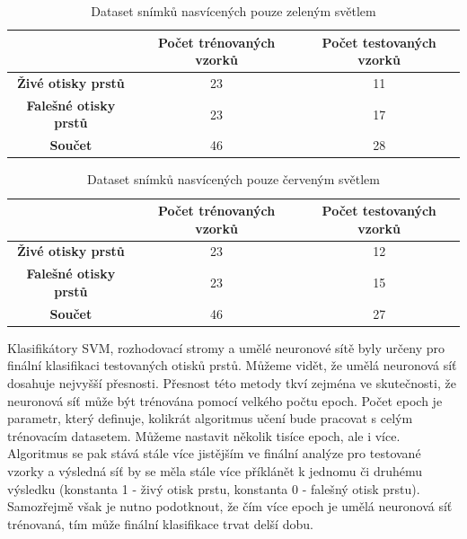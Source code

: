 \capstartfalse
\begin{table}[!htbp]
\centering
\begin{tabular}{|c|c|c|}
\hline
\textbf{}                     & \textbf{Počet trénovaných vzorků} & \textbf{Počet testovaných vzorků} \\ \hline
\textbf{Živé otisky prstů}    & 23                                & 11                                \\ \hline
\textbf{Falešné otisky prstů} & 23                                & 17                                \\ \hline
\textbf{Součet}               & 46                                & 28                                \\ \hline
\end{tabular}
\caption{Dataset snímků nasvícených pouze zeleným světlem}
\end{table}
\capstarttrue

\capstartfalse
\begin{table}[!htbp]
\centering
\begin{tabular}{|c|c|c|}
\hline
\textbf{}                     & \textbf{Počet trénovaných vzorků} & \textbf{Počet testovaných vzorků} \\ \hline
\textbf{Živé otisky prstů}    & 23                                & 12                                \\ \hline
\textbf{Falešné otisky prstů} & 23                                & 15                                \\ \hline
\textbf{Součet}               & 46                                & 27                                \\ \hline
\end{tabular}
\caption{Dataset snímků nasvícených pouze červeným světlem}
\end{table}
\capstarttrue

Klasifikátory SVM, rozhodovací stromy a umělé neuronové sítě byly určeny pro finální klasifikaci testovaných otisků prstů. Můžeme vidět, že umělá neuronová síť dosahuje nejvyšší přesnosti. Přesnost této metody tkví zejména ve skutečnosti, že neuronová síť může být trénována pomocí velkého počtu epoch. Počet epoch je parametr, který definuje, kolikrát algoritmus učení bude pracovat s celým trénovacím datasetem. \cite{BatchEpochANN} Můžeme nastavit několik tisíce epoch, ale i více. Algoritmus se pak stává stále více jistějším ve finální analýze pro testované vzorky a výsledná síť by se měla stále více příklánět k jednomu či druhému výsledku (konstanta 1 - živý otisk prstu, konstanta 0 - falešný otisk prstu). Samozřejmě však je nutno podotknout, že čím více epoch je umělá neuronová síť trénovaná, tím může finální klasifikace trvat delší dobu. \\\\\\\\\

